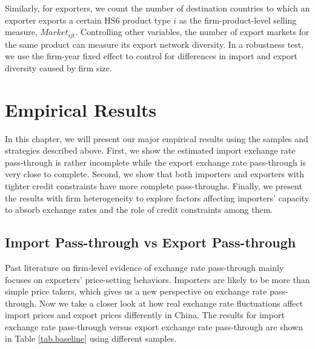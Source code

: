 \documentclass[12pt]{article}
\begin{document}
Similarly, for exporters, we count the number of destination countries to which an exporter exports a certain HS6 product type $i$ as the firm-product-level selling measure, $Market_{ijt}$. Controlling other variables, the number of export markets for the same product can measure its export network diversity. In a robustness test, we use the firm-year fixed effect to control for differences in import and export diversity caused by firm size.

\section{Empirical Results} \label{Results}
In this chapter, we will present our major empirical results using the samples and strategies described above. First, we show the estimated import exchange rate pass-through is rather incomplete while the export exchange rate pass-through is very close to complete. Second, we show that both importers and exporters with tighter credit constraints have more complete pass-throughs. Finally, we present the results with firm heterogeneity to explore factors affecting importers' capacity to absorb exchange rates and the role of credit constraints among them.

\subsection{Import Pass-through vs Export Pass-through} \label{Results-Baseline}

Past literature on firm-level evidence of exchange rate pass-through mainly focuses on exporters' price-setting behaviors. Importers are likely to be more than simple price takers, which gives us a new perspective on exchange rate pass-through. Now we take a closer look at how real exchange rate fluctuations affect import prices and export prices differently in China. The results for import exchange rate pass-through versus export exchange rate pass-through are shown in Table \ref{tab.baseline} using different samples.
\end{document}
